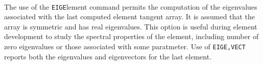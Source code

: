  \\{\smallskip}
\headb

The use of the {\tt EIGE}lement command permits the computation
of the eigenvalues associated with the last computed
element tangent array.  It is assumed that the array is symmetric
and has real eigenvalues.  This option is useful during
element development to study the spectral properties of
the element, including number of zero eigenvalues or those
associated with some paratmeter.  Use of {\tt EIGE,VECT} reports
both the eigenvalues and eigenvectors for the last element.
\vfill\eject
